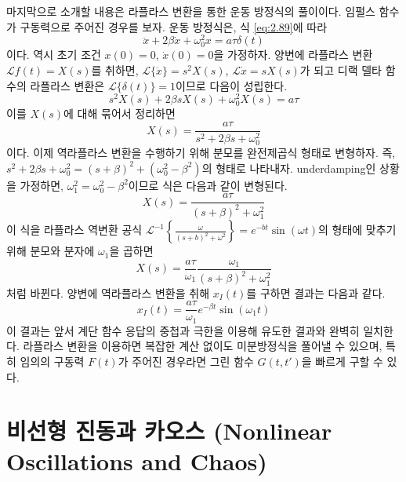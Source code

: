 \documentclass[chapter, oneside, b5paper]{oblivoir}
\theoremstyle{plain}
\theoremstyle{definition}
\theoremstyle{remark}
\begin{document}
마지막으로 소개할 내용은 라플라스 변환을 통한 운동 방정식의 풀이이다. 임펄스 함수가 구동력으로 주어진 경우를 보자. 운동 방정식은, 식 \ref{eq:2.89}에 따라
\begin{equation}
    \ddot{x} + 2\beta \dot{x}+\omega_0^2x = a \tau \delta(t) \label{eq:2.101}
\end{equation}
이다. 역시 초기 조건 $x(0) = 0$, $\dot{x}(0) = 0$을 가정하자. 양변에 라플라스 변환 $\mathcal{L}{f(t)} = X(s)$를 취하면, $\mathcal{L}\{\ddot{x}\} = s^2 X(s)$, $\mathcal{L}{\dot{x}} = s X(s)$가 되고 디랙 델타 함수의 라플라스 변환은 $\mathcal{L}\{\delta(t)\} = 1$이므로 다음이 성립한다.
\begin{equation}
    s^2 X(s) + 2\beta s X(s) + \omega_0^2 X(s) = a\tau
\end{equation}
이를 $X(s)$에 대해 묶어서 정리하면
\begin{equation}
    X(s) = \frac{a\tau}{s^2 + 2\beta s + \omega_0^2} \label{eq:2.103}
\end{equation}
이다. 이제 역라플라스 변환을 수행하기 위해 분모를 완전제곱식 형태로 변형하자. 즉, $s^2 + 2\beta s + \omega_0^2 = (s + \beta)^2 + (\omega_0^2 - \beta^2)$의 형태로 나타내자. underdamping인 상황을 가정하면, $\omega_1^2 = \omega_0^2 - \beta^2$이므로 식은 다음과 같이 변형된다.
\begin{equation}
    X(s) = \frac{a\tau}{(s + \beta)^2 + \omega_1^2}
\end{equation}
이 식을 라플라스 역변환 공식 $\mathcal{L}^{-1}\left\{ \frac{\omega}{(s + b)^2 + \omega^2} \right\} = e^{-bt} \sin(\omega t)$의 형태에 맞추기 위해 분모와 분자에 $\omega_1$을 곱하면
\begin{equation}
    X(s) = \frac{a\tau}{\omega_1} \frac{\omega_1}{(s + \beta)^2 + \omega_1^2}
\end{equation}
처럼 바뀐다. 양변에 역라플라스 변환을 취해 $x_I(t)$를 구하면 결과는 다음과 같다.
\begin{equation}
    x_I(t) = \frac{a\tau}{\omega_1} e^{-\beta t} \sin(\omega_1 t)
\end{equation}
이 결과는 앞서 계단 함수 응답의 중첩과 극한을 이용해 유도한 결과와 완벽히 일치한다. 라플라스 변환을 이용하면 복잡한 계산 없이도 미분방정식을 풀어낼 수 있으며, 특히 임의의 구동력 $F(t)$가 주어진 경우라면 그린 함수 $G(t, t')$을 빠르게 구할 수 있다.


\newpage
\chapter{비선형 진동과 카오스 (Nonlinear Oscillations and Chaos)}
\end{document}
